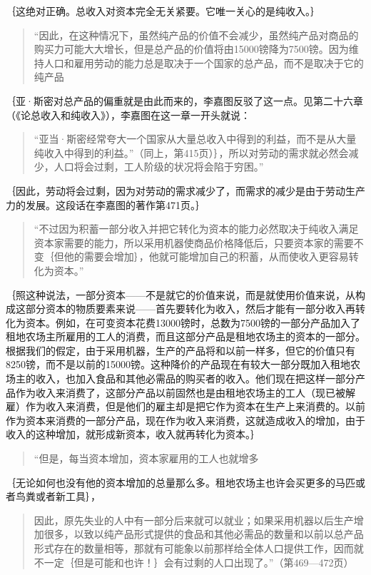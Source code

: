 ｛这绝对正确。总收入对资本完全无关紧要。它唯一关心的是纯收入。｝

\begin{quote}{“因此，在这种情况下，虽然纯产品的价值不会减少，虽然纯产品对商品的购买力可能大大增长，但是总产品的价值将由15000镑降为7500镑。因为维持人口和雇用劳动的能力总是取决于一个国家的总产品，而不是取决于它的纯产品}\end{quote}

｛亚·斯密对总产品的偏重就是由此而来的，李嘉图反驳了这一点。见第二十六章（《论总收入和纯收入》），李嘉图在这一章一开头就说：

\begin{quote}{“亚当·斯密经常夸大一个国家从大量总收入中得到的利益，而不是从大量纯收入中得到的利益。”（同上，第415页）｝，所以对劳动的需求就必然会减少，人口将会过剩，工人阶级的状况将会陷于穷困。”}\end{quote}

｛因此，劳动将会过剩，因为对劳动的需求减少了，而需求的减少是由于劳动生产力的发展。这段话在李嘉图的著作第471页。｝

\begin{quote}{“不过因为积蓄一部分收入并把它转化为资本的能力必然取决于纯收入满足资本家需要的能力，所以采用机器使商品价格降低后，只要资本家的需要不变｛但他的需要会增加｝，他就可能增加自己的积蓄，从而使收入更容易转化为资本。”}\end{quote}

｛照这种说法，一部分资本——不是就它的价值来说，而是就使用价值来说，从构成这部分资本的物质要素来说——首先要转化为收入，然后才能有一部分收入再转化为资本。例如，在可变资本花费13000镑时，总数为7500镑的一部分产品加入了租地农场主所雇用的工人的消费，而且这部分产品是租地农场主的资本的一部分。根据我们的假定，由于采用机器，生产的产品将和以前一样多，但它的价值只有8250镑，而不是以前的15000镑。这种降价的产品现在有较大一部分既加入租地农场主的收入，也加入食品和其他必需品的购买者的收入。他们现在把这样一部分产品作为收入来消费了，这部分产品以前固然也是由租地农场主的工人（现已被解雇）作为收入来消费，但是他们的雇主却是把它作为资本在生产上来消费的。以前作为资本来消费的一部分产品，现在作为收入来消费，这就造成收入的增加，由于收入的这种增加，就形成新资本，收入就再转化为资本。｝

\begin{quote}{“但是，每当资本增加，资本家雇用的工人也就增多}\end{quote}

｛无论如何也没有他的资本增加的总量那么多。租地农场主也许会买更多的马匹或者鸟粪或者新工具｝，

\begin{quote}{因此，原先失业的人中有一部分后来就可以就业；如果采用机器以后生产增加很多，以致以纯产品形式提供的食品和其他必需品的数量和以前以总产品形式存在的数量相等，那就有可能象以前那样给全体人口提供工作，因而就不一定｛但是可能和也许！｝会有过剩的人口出现了。”（第469—472页）}\end{quote}

